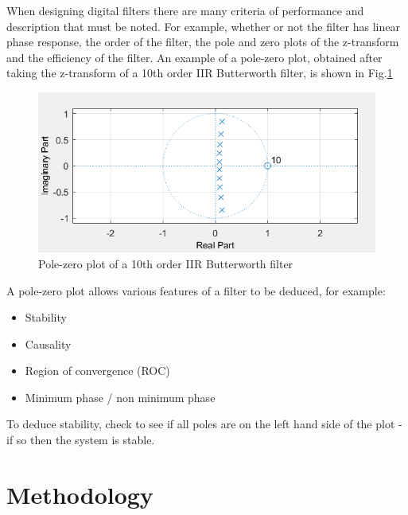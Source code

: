 \documentclass[conference]{IEEEtran}
\begin{document}
        When designing digital filters there are many criteria of performance and description that must be noted.
        For example, whether or not the filter has linear phase response, the order of the filter, the pole and zero plots of the z-transform and the efficiency of the filter.
        An example of a pole-zero plot, obtained after taking the z-transform of a 10th order IIR Butterworth filter, is shown in Fig.\ref{zplot}
        \begin{figure}[H]
            \centering
            \includegraphics[scale = 0.65]{resources/poleZero.png}
            \caption{Pole-zero plot of a 10th order IIR Butterworth filter}
            \label{zplot}
        \end{figure}
        A pole-zero plot allows various features of a filter to be deduced, for example:
        \begin{itemize}
            \item Stability
            \item Causality
            \item Region of convergence (ROC)
            \item Minimum phase / non minimum phase
        \end{itemize}
        To deduce stability, check to see if all poles are on the left hand side of the plot - if so then the system is stable.

\section{Methodology}
\end{document}
